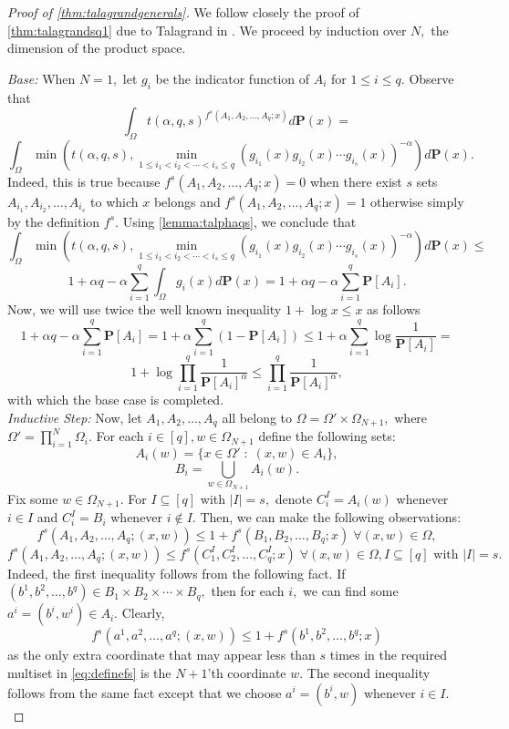 \documentclass[11pt]{article}\usepackage{amsfonts}
\numberwithin{theorem}{subsection}
\newcommand{\prob}{\mathbf{P}}
\begin{document}
\begin{proof}[Proof of \cref{thm:talagrandgenerals}] We follow closely the proof of \cref{thm:talagrandsq1} due to Talagrand in \cite{Talagrand96}. We proceed by induction over $N,$ the dimension of the product space.

\noindent
\textit{Base:}
When $N = 1,$ let $g_i$ be the indicator function of $A_i$ for $1\le i \le q.$ Observe that 
$$
\int_{\Omega}
t(\alpha, q, s)^{f^s(A_1, A_2, \ldots, A_q; x)}d\prob(x) = 
$$
$$
\int_{\Omega}
\min \left(
t(\alpha, q, s),
\min_{1\le i_1<i_2<\cdots <i_s\le q}
(g_{i_1}(x)g_{i_2}(x)\cdots g_{i_s}(x))^{-\alpha}
\right)
d\prob(x).
$$
Indeed, this is true because $f^s(A_1, A_2, \ldots, A_q; x) = 0$ when there exist $s$ sets $A_{i_1}, A_{i_2}, \ldots, A_{i_s}$ to which $x$ belongs and $f^s(A_1, A_2, \ldots, A_q; x) = 1$ otherwise simply by the definition $f^s.$ Using \cref{lemma:talphaqs},
we conclude that 
$$
\int_{\Omega}
\min \left(
t(\alpha, q, s),
\min_{1\le i_1<i_2<\cdots <i_s\le q}
(g_{i_1}(x)g_{i_2}(x)\cdots g_{i_s}(x))^{-\alpha}
\right)
d\prob(x)\le 
$$
$$
1 + \alpha q - \alpha \sum_{i=1}^q\int_{\Omega} g_i(x)d\prob(x) = 
1 + \alpha q - \alpha\sum_{i=1}^q\prob[A_i].
$$
Now, we will use twice the well known inequality $1 + \log x \le x$ as follows
$$
1 + \alpha q - \alpha\sum_{i=1}^q\prob[A_i] = 
1 + \alpha \sum_{i=1}^q (1 - \prob[A_i]) \le 
1 + \alpha \sum_{i = 1}^q \log \frac{1}{\prob[A_i]} = 
$$
$$
1 + \log \prod_{i=1}^q \frac{1}{\prob[A_i]^\alpha} \le
\prod_{i=1}^q \frac{1}{\prob[A_i]^\alpha}, 
$$
with which the base case is completed.\\

\noindent
\textit{Inductive Step:} Now, let $A_1, A_2, \ldots, A_q$ all belong to $\Omega = \Omega'\times \Omega_{N+1},$ where $\Omega' = \prod_{i=1}^N\Omega_i.$ For each $i\in [q],w\in \Omega_{N+1}$ define the following sets:
$$
A_i(w) = \{x\in \Omega'\;  : \; (x,w) \in A_i \},
$$
$$
B_i = \bigcup_{w\in \Omega_{N+1}}A_i(w).
$$
Fix some $w\in \Omega_{N+1}.$ For $I\subseteq [q]$ with $|I| = s,$ denote 
$C^I_i = A_i(w)$ whenever $i \in I$ and $C^I_i = B_i$ whenever $i \not \in I.$ Then, we can make the following observations:
$$
f^s(A_1, A_2, \ldots, A_q; (x,w))\le 
1 + f^s(B_1, B_2, \ldots, B_q; x)\; \forall (x,w)\in \Omega,
$$
$$
f^s(A_1, A_2, \ldots, A_q; (x,w))\le 
 f^s(C^I_1, C^I_2, \ldots, C^I_q; x)\; \forall (x,w)\in \Omega, I\subseteq [q] \text{ with }|I| = s.
$$
Indeed, the first inequality follows from the following fact. If $(b^1, b^2, \ldots, b^q)\in B_1\times B_2\times\cdots \times B_q,$ then for each $i, $ we can find some $a^i = (b^i, w^i)\in A_i.$ Clearly, 
$$
f^s(a^1, a^2, \ldots, a^q; (x,w))\le 
1 + f^s(b^1, b^2, \ldots, b^q; x)
$$
as the only extra coordinate that may appear less than $s$ times in the required multiset in \cref{eq:definefs} is the $N+1$'th coordinate $w.$ The second inequality follows from the same fact except that we choose $a^i = (b^i,w)$ whenever $i\in I.$\\


\end{proof}
\end{document}
